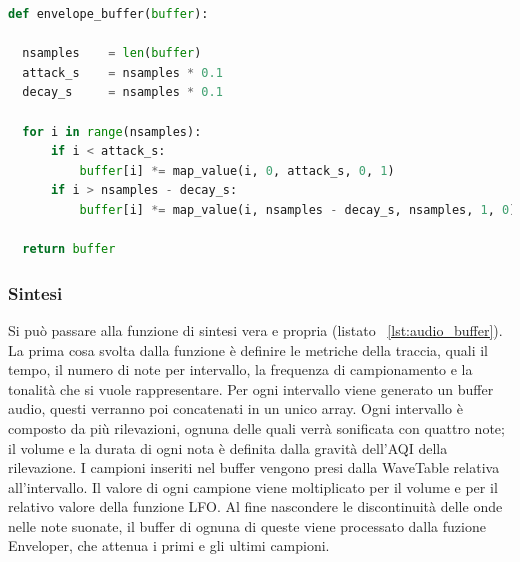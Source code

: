 \begin{lstlisting}[language=Python,caption={La funzione Enveloper.},label={lst:enveloper}]
def envelope_buffer(buffer):

  nsamples    = len(buffer)
  attack_s    = nsamples * 0.1
  decay_s     = nsamples * 0.1

  for i in range(nsamples):
      if i < attack_s:
          buffer[i] *= map_value(i, 0, attack_s, 0, 1)
      if i > nsamples - decay_s:
          buffer[i] *= map_value(i, nsamples - decay_s, nsamples, 1, 0)

  return buffer
\end{lstlisting}

\subsubsection{Sintesi}
Si può passare alla funzione di sintesi vera e propria (listato ~\ref{lst:audio_buffer}).
La prima cosa svolta dalla funzione è definire le metriche della traccia, quali il tempo, il numero di note per intervallo, la frequenza di campionamento e la tonalità che si vuole rappresentare.
Per ogni intervallo viene generato un buffer audio, questi verranno poi concatenati in un unico array.
Ogni intervallo è composto da più rilevazioni, ognuna delle quali verrà sonificata con quattro note; il volume e la durata di ogni nota è definita dalla gravità dell'AQI della rilevazione.
I campioni inseriti nel buffer vengono presi dalla WaveTable relativa all'intervallo.
Il valore di ogni campione viene moltiplicato per il volume e per il relativo valore della funzione LFO.
Al fine nascondere le discontinuità delle onde nelle note suonate, il buffer di ognuna di queste viene processato dalla fuzione Enveloper, che attenua i primi e gli ultimi campioni.


